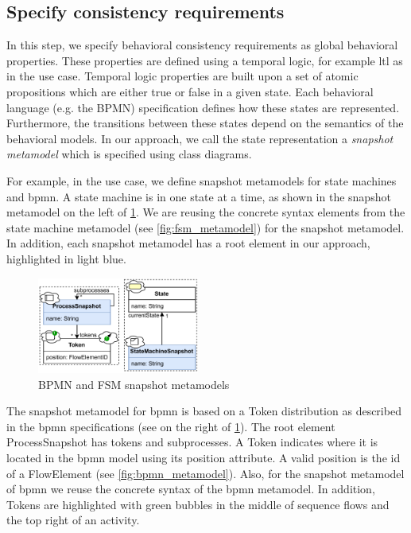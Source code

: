 \documentclass{jot}
\begin{document}
\subsection{Specify consistency requirements} \label{subsec:specify_consistency_requirements}
In this step, we specify behavioral consistency requirements as global behavioral properties.
These properties are defined using a temporal logic, for example \gls*{ltl} as in the use case.
Temporal logic properties are built upon a set of atomic propositions which are either true or false in a given state.
Each behavioral language (e.g. the BPMN) specification defines how these states are represented.
Furthermore, the transitions between these states depend on the semantics of the behavioral models.
In our approach, we call the state representation a \emph{snapshot metamodel} which is specified using class diagrams.

For example, in the use case, we define snapshot metamodels for state machines and \gls*{bpmn}.
A state machine is in one state at a time, as shown in the snapshot metamodel on the left of \cref{fig:snapshot_metamodels}.
We are reusing the concrete syntax elements from the state machine metamodel (see \cref{fig:fsm_metamodel}) for the snapshot metamodel.
In addition, each snapshot metamodel has a root element in our approach, highlighted in light blue.
\begin{figure}[h]
    \centering
    \includegraphics[width=0.475\textwidth]{figures/snapshot_metamodels.pdf}
    \caption{BPMN and FSM snapshot metamodels}
    \label{fig:snapshot_metamodels}
\end{figure}

The snapshot metamodel for \gls*{bpmn} is based on a \textsf{Token} distribution as described in the \gls*{bpmn} specifications \cite{objectmanagementgroupBusinessProcessModel2013} (see on the right of \cref{fig:snapshot_metamodels}).
The root element \textsf{ProcessSnapshot} has \textsf{tokens} and \textsf{subprocesses}.
A \textsf{Token} indicates where it is located in the \gls*{bpmn} model using its \textsf{position} attribute.
A valid \textsf{position} is the \textsf{id} of a \textsf{FlowElement} (see \cref{fig:bpmn_metamodel}).
Also, for the snapshot metamodel of \gls*{bpmn} we reuse the concrete syntax of the \gls*{bpmn} metamodel.
In addition, \textsf{Token}s are highlighted with green bubbles in the middle of sequence flows and the top right of an activity.
\end{document}
